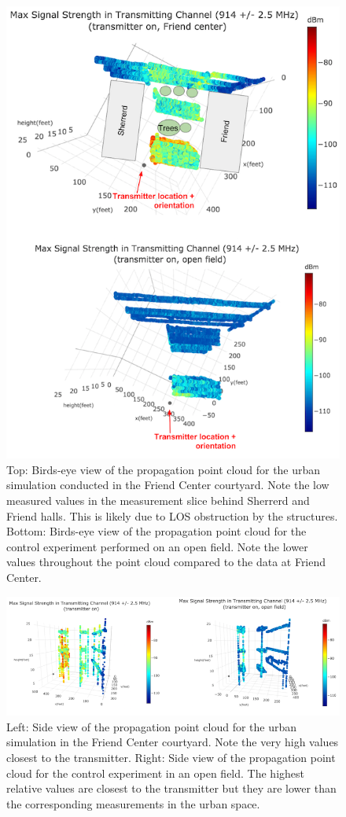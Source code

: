 \documentclass[pageno]{jpaper}
\begin{document}
\begin{figure}
	\caption{Top: Birds-eye view of the propagation point cloud for the urban simulation conducted in the Friend Center courtyard. Note the low measured values in the measurement slice behind Sherrerd and Friend halls. This is likely due to LOS obstruction by the structures. Bottom: Birds-eye view of the propagation point cloud for the control experiment performed on an open field. Note the lower values throughout the point cloud compared to the data at Friend Center. }
	\centerline{\includegraphics{friend_3}}
\end{figure}

\begin{figure}
	\caption{Left: Side view of the propagation point cloud for the urban simulation in the Friend Center courtyard. Note the very high values closest to the transmitter. Right: Side view of the propagation point cloud for the control experiment in an open field. The highest relative values are closest to the transmitter but they are lower than the corresponding measurements in the urban space. }
	\centerline{\includegraphics{friend_4}}
\end{figure}
\end{document}
